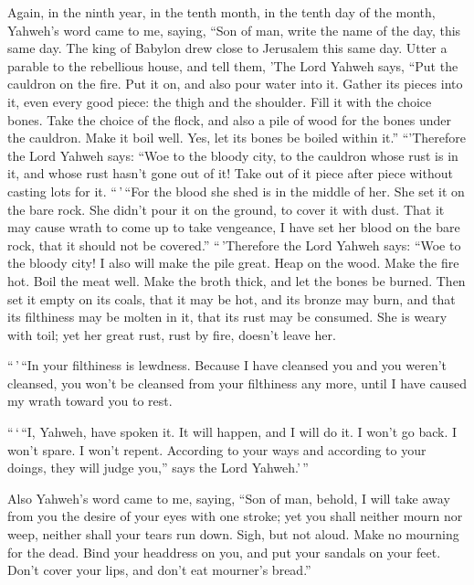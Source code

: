  Again, in the ninth year, in the tenth month, in the
tenth day of the month, Yahweh's word came to me, saying, 
``Son of man, write the name of the day, this same day. The king of
Babylon drew close to Jerusalem this same day.  Utter a
parable to the rebellious house, and tell them, 'The Lord Yahweh says,
``Put the cauldron on the fire. Put it on, and also pour water into it.
 Gather its pieces into it, even every good piece: the
thigh and the shoulder. Fill it with the choice bones. 
Take the choice of the flock, and also a pile of wood for the bones
under the cauldron. Make it boil well. Yes, let its bones be boiled
within it.''  ``'Therefore the Lord Yahweh says: ``Woe to
the bloody city, to the cauldron whose rust is in it, and whose rust
hasn't gone out of it! Take out of it piece after piece without casting
lots for it.  ``\,'\,``For the blood she shed is in the
middle of her. She set it on the bare rock. She didn't pour it on the
ground, to cover it with dust.  That it may cause wrath to
come up to take vengeance, I have set her blood on the bare rock, that
it should not be covered.''  ``\,'Therefore the Lord
Yahweh says: ``Woe to the bloody city! I also will make the pile great.
 Heap on the wood. Make the fire hot. Boil the meat well.
Make the broth thick, and let the bones be burned.  Then
set it empty on its coals, that it may be hot, and its bronze may burn,
and that its filthiness may be molten in it, that its rust may be
consumed.  She is weary with toil; yet her great rust,
rust by fire, doesn't leave her.

 ``\,'\,``In your filthiness is lewdness. Because I have
cleansed you and you weren't cleansed, you won't be cleansed from your
filthiness any more, until I have caused my wrath toward you to rest.

 ``\,`\,``I, Yahweh, have spoken it. It will happen, and
I will do it. I won't go back. I won't spare. I won't repent. According
to your ways and according to your doings, they will judge you,'' says
the Lord Yahweh.'\,''

 Also Yahweh's word came to me, saying, 
``Son of man, behold, I will take away from you the desire of your eyes
with one stroke; yet you shall neither mourn nor weep, neither shall
your tears run down.  Sigh, but not aloud. Make no
mourning for the dead. Bind your headdress on you, and put your sandals
on your feet. Don't cover your lips, and don't eat mourner's bread.''


